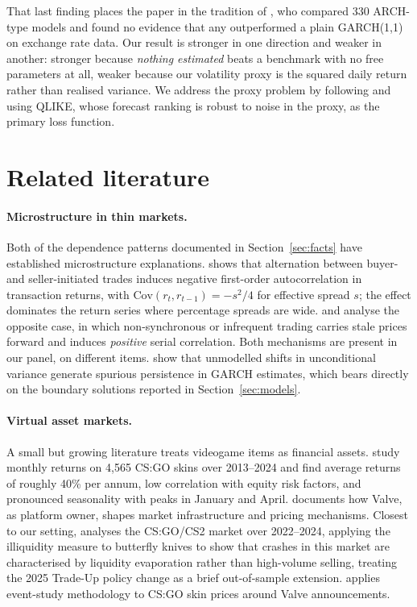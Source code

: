 \documentclass[11pt,a4paper]{article}
\begin{document}
That last finding places the paper in the tradition of \citet{HansenLunde2005},
who compared 330 ARCH-type models and found no evidence that any outperformed
a plain GARCH(1,1) on exchange rate data. Our result is stronger in one
direction and weaker in another: stronger because \emph{nothing estimated}
beats a benchmark with no free parameters at all, weaker because our volatility
proxy is the squared daily return rather than realised variance. We address
the proxy problem by following \citet{Patton2011} and using QLIKE, whose
forecast ranking is robust to noise in the proxy, as the primary loss function.

\section{Related literature}

\paragraph{Microstructure in thin markets.}
Both of the dependence patterns documented in Section~\ref{sec:facts} have
established microstructure explanations. \citet{Roll1984} shows that
alternation between buyer- and seller-initiated trades induces negative
first-order autocorrelation in transaction returns, with
$\mathrm{Cov}(r_t, r_{t-1}) = -s^2/4$ for effective spread $s$; the effect
dominates the return series where percentage spreads are wide.
\citet{ScholesWilliams1977} and \citet{LoMacKinlay1990} analyse the opposite
case, in which non-synchronous or infrequent trading carries stale prices
forward and induces \emph{positive} serial correlation. Both mechanisms are
present in our panel, on different items.
\citet{LamoureuxLastrapes1990} show that unmodelled shifts in unconditional
variance generate spurious persistence in GARCH estimates, which bears
directly on the boundary solutions reported in Section~\ref{sec:models}.

\paragraph{Virtual asset markets.}
A small but growing literature treats videogame items as financial assets.
\citet{Dobrynskaya2025} study monthly returns on 4{,}565 CS:GO skins over
2013--2024 and find average returns of roughly 40\% per annum, low correlation
with equity risk factors, and pronounced seasonality with peaks in January and
April. \citet{Glaser2022} documents how Valve, as platform owner, shapes market
infrastructure and pricing mechanisms. Closest to our setting,
\citet{Gu2026} analyses the CS:GO/CS2 market over 2022--2024, applying the
\citet{Amihud2002} illiquidity measure to butterfly knives to show that
crashes in this market are characterised by liquidity evaporation rather than
high-volume selling, treating the 2025 Trade-Up policy change as a brief
out-of-sample extension. \citet{Nian2026} applies event-study methodology to
CS:GO skin prices around Valve announcements.
\end{document}
